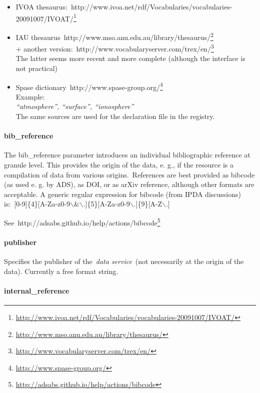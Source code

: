 \documentclass[11pt,a4paper]{ivoa}
\begin{document}
\begin{itemize}
\item IVOA thesaurus: http://www.ivoa.net/rdf/Vocabularies/vocabularies-20091007/IVOAT/\footnote{\url{http://www.ivoa.net/rdf/Vocabularies/vocabularies-20091007/IVOAT/}}
\item IAU thesaurus http://www.mso.anu.edu.au/library/thesaurus/\footnote{\url{http://www.mso.anu.edu.au/library/thesaurus/}}\\+ another version: http://www.vocabularyserver.com/trex/en/\footnote{\url{http://www.vocabularyserver.com/trex/en/}}\\The latter seems more recent and more complete (although the interface is not practical)
\item Spase dictionary http://www.spase-group.org/\footnote{\url{http://www.spase-group.org/}}\\Example: \\\emph{``atmosphere'', ``surface'', ``ionosphere''}\\The same sources are used for the declaration file in the registry.
\end{itemize}

\paragraph{bib\_reference}

The bib\_reference parameter introduces an individual bibliographic reference at granule level. This provides the origin of the data, e. g., if the resource is a compilation of data from various origins. References are best provided as bibcode (as used e. g. by ADS), as DOI, or as arXiv reference, although other formats are acceptable. A generic regular expression for bibcode (from IPDA discussions) is: [0-9]\{4\}[A-Za-z0-9$\backslash$\&$\backslash$.]\{5\}[A-Za-z0-9$\backslash$.]\{9\}[A-Z$\backslash$.] 

See http://adsabs.github.io/help/actions/bibcode\footnote{\url{http://adsabs.github.io/help/actions/bibcode}}

\paragraph{publisher}

Specifies the publisher of the \emph{data service} (not necessarily at the origin of the data). Currently a free format string.\\

\paragraph{internal\_reference}
\end{document}
